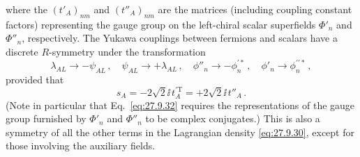 where the \((t'_A)_{nm}\) and \((t''_A)_{nm}\) are the matrices (including
coupling constant factors) representing the gauge group on the left-chiral
scalar superfields \(\Phi'_n\) and \(\Phi''_n\), respectively. The Yukawa
couplings between fermions and scalars have a discrete \(R\)-symmetry under
the transformation
\begin{equation}
  \lambda_{AL}\longrightarrow-\psi_{AL}\,,
  \quad
  \psi_{AL}\longrightarrow+\lambda_{AL}\,,
  \quad
  \phi''_n\longrightarrow-\phi_n^{\prime *}\,,
  \quad
  \phi'_n\longrightarrow\phi_n^{\prime\prime *}\,,
  \tag{27.9.31}\label{eq:27.9.31}
\end{equation}
provided that
\begin{equation}
  s_A=-2\sqrt{2}\ii\,t_A^{\prime\mathrm T}
  =+2\sqrt{2}\ii\,t''_A\,.
  \tag{27.9.32}\label{eq:27.9.32}
\end{equation}
(Note in particular that Eq.~\eqref{eq:27.9.32} requires the representations
of the gauge group furnished by \(\Phi'_n\) and \(\Phi''_n\) to be complex
conjugates.) This is also a symmetry of all the other terms in the Lagrangian
density \eqref{eq:27.9.30}, except for those involving the auxiliary fields.

